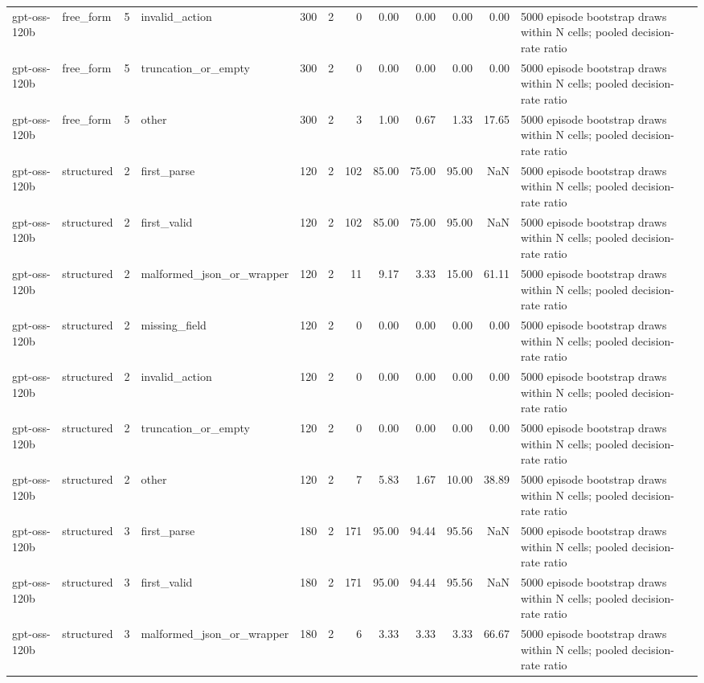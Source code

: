\begin{tabular}{llllrrrrrrrl}
gpt-oss-120b & free\_form & 5 & invalid\_action & 300 & 2 & 0 & 0.00 & 0.00 & 0.00 & 0.00 & 5000 episode bootstrap draws within N cells; pooled decision-rate ratio \\
gpt-oss-120b & free\_form & 5 & truncation\_or\_empty & 300 & 2 & 0 & 0.00 & 0.00 & 0.00 & 0.00 & 5000 episode bootstrap draws within N cells; pooled decision-rate ratio \\
gpt-oss-120b & free\_form & 5 & other & 300 & 2 & 3 & 1.00 & 0.67 & 1.33 & 17.65 & 5000 episode bootstrap draws within N cells; pooled decision-rate ratio \\
gpt-oss-120b & structured & 2 & first\_parse & 120 & 2 & 102 & 85.00 & 75.00 & 95.00 & NaN & 5000 episode bootstrap draws within N cells; pooled decision-rate ratio \\
gpt-oss-120b & structured & 2 & first\_valid & 120 & 2 & 102 & 85.00 & 75.00 & 95.00 & NaN & 5000 episode bootstrap draws within N cells; pooled decision-rate ratio \\
gpt-oss-120b & structured & 2 & malformed\_json\_or\_wrapper & 120 & 2 & 11 & 9.17 & 3.33 & 15.00 & 61.11 & 5000 episode bootstrap draws within N cells; pooled decision-rate ratio \\
gpt-oss-120b & structured & 2 & missing\_field & 120 & 2 & 0 & 0.00 & 0.00 & 0.00 & 0.00 & 5000 episode bootstrap draws within N cells; pooled decision-rate ratio \\
gpt-oss-120b & structured & 2 & invalid\_action & 120 & 2 & 0 & 0.00 & 0.00 & 0.00 & 0.00 & 5000 episode bootstrap draws within N cells; pooled decision-rate ratio \\
gpt-oss-120b & structured & 2 & truncation\_or\_empty & 120 & 2 & 0 & 0.00 & 0.00 & 0.00 & 0.00 & 5000 episode bootstrap draws within N cells; pooled decision-rate ratio \\
gpt-oss-120b & structured & 2 & other & 120 & 2 & 7 & 5.83 & 1.67 & 10.00 & 38.89 & 5000 episode bootstrap draws within N cells; pooled decision-rate ratio \\
gpt-oss-120b & structured & 3 & first\_parse & 180 & 2 & 171 & 95.00 & 94.44 & 95.56 & NaN & 5000 episode bootstrap draws within N cells; pooled decision-rate ratio \\
gpt-oss-120b & structured & 3 & first\_valid & 180 & 2 & 171 & 95.00 & 94.44 & 95.56 & NaN & 5000 episode bootstrap draws within N cells; pooled decision-rate ratio \\
gpt-oss-120b & structured & 3 & malformed\_json\_or\_wrapper & 180 & 2 & 6 & 3.33 & 3.33 & 3.33 & 66.67 & 5000 episode bootstrap draws within N cells; pooled decision-rate ratio \\

\end{tabular}
